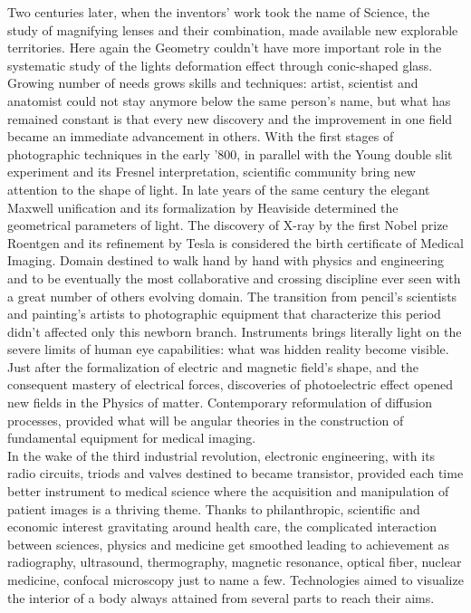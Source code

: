 Two centuries later, when the inventors' work took the name of Science, the study of magnifying lenses and their combination, made available new explorable territories. Here again the Geometry couldn't have more important role in the systematic study of the lights deformation effect through conic-shaped glass.\\
Growing number of needs grows skills and techniques: artist, scientist and anatomist could not stay anymore below the same person's name, but what has remained constant is that every new discovery and the improvement in one field became an immediate advancement in others.
With the first stages of photographic techniques in the early '800, in parallel with the Young double slit experiment and its Fresnel interpretation, scientific community bring new attention to the shape of light. In late years of the same century the elegant Maxwell unification and its formalization by Heaviside determined the geometrical parameters of light. The discovery of X-ray by the first Nobel prize Roentgen and its refinement by Tesla is considered \cite{bradley2008history} the birth certificate of Medical Imaging. Domain destined to walk hand by hand with physics and engineering and to be eventually the most collaborative and crossing discipline ever seen with a great number of others evolving domain. The transition from pencil's scientists and painting's artists to photographic equipment that characterize this period didn't affected only this newborn branch. Instruments brings literally light on the severe limits of human eye capabilities: what was hidden reality become visible. \\
Just after the formalization of electric and magnetic field's shape, and the consequent mastery of electrical forces, discoveries of photoelectric effect opened new fields in the Physics of matter. Contemporary reformulation of diffusion processes, provided what will be angular theories in the construction of fundamental equipment for medical imaging.\\
In the wake of the third industrial revolution, electronic engineering, with its radio circuits, triods and valves destined to became transistor, provided each time better instrument to medical science where the acquisition and manipulation of patient images is a thriving theme. 
Thanks to philanthropic, scientific and economic interest gravitating around health care, the complicated interaction between sciences, physics and medicine get smoothed leading to achievement as radiography, ultrasound, thermography, magnetic resonance, optical fiber, nuclear medicine, confocal microscopy just to name a few. Technologies aimed to visualize the interior of a body always attained from several parts to reach their aims. \\
